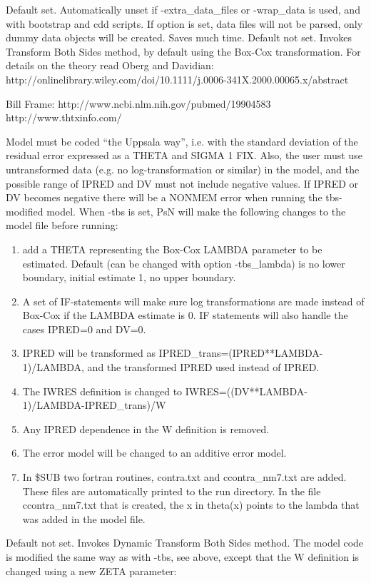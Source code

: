 \begin{optionlist}
\nextopt
{}
Default set. Automatically unset if -extra\_data\_files or -wrap\_data is used, and with bootstrap and cdd scripts. If option is set, data files will not be parsed, only dummy data objects will be created. Saves much time. 
\nextopt
{}
Default not set. Invokes Transform Both Sides method, by default using the Box-Cox transformation. For details on the theory read Oberg and Davidian: http://onlinelibrary.wiley.com/doi/10.1111/j.0006-341X.2000.00065.x/abstract

Bill Frame: http://www.ncbi.nlm.nih.gov/pubmed/19904583
 http://www.thtxinfo.com/
 
 Model must be coded “the Uppsala way”, i.e. with the standard deviation of the residual error expressed as a THETA and SIGMA 1 FIX. 
Also, the user must use untransformed data (e.g. no log-transformation or similar) in the model, and the possible range of IPRED and DV must not include negative values. If IPRED or DV becomes negative there will be a NONMEM error when running the tbs-modified model. 
 When -tbs is set, PsN will make the following changes to the model file before running:
\begin{enumerate}
	\item add a THETA representing the Box-Cox LAMBDA parameter to be estimated. Default (can be changed with option -tbs\_lambda) is no lower boundary, initial estimate 1, no upper boundary.
	\item A set of IF-statements will make sure log transformations are made instead of Box-Cox if the LAMBDA estimate is 0. IF statements will also handle the cases IPRED=0 and DV=0.
	\item IPRED will be transformed as 
 IPRED\_trans=(IPRED**LAMBDA-1)/LAMBDA, 
 and the transformed  IPRED used instead of IPRED.  
	\item The IWRES definition is changed to 
 IWRES=((DV**LAMBDA-1)/LAMBDA-IPRED\_trans)/W
	\item Any IPRED dependence in the W definition is removed.
	\item The error model will be changed to an additive error model.
	\item In \$SUB two fortran routines, contra.txt and ccontra\_nm7.txt are added. These files are automatically printed to the run directory. In the file ccontra\_nm7.txt that is created, the x in theta(x) points to the lambda that was added in the model file.
\end{enumerate}
\nextopt
{}
Default not set. Invokes Dynamic Transform Both Sides method. The model code is modified the same way as with -tbs, see above, except that the W definition is changed using a new ZETA parameter:

\end{optionlist}
